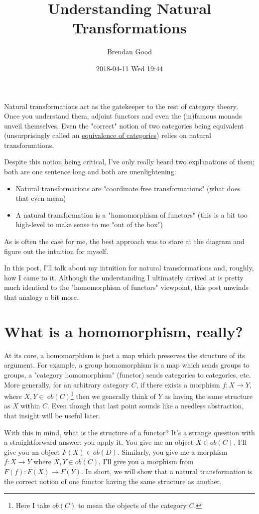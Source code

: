 \documentclass[11pt]{article}
\author{Brendan Good}
\date{2018-04-11 Wed 19:44}
\title{Understanding Natural Transformations}
\begin{document}
\maketitle
Natural transformations act as the gatekeeper to the rest of category theory. Once you understand them, adjoint functors and even the (in)famous monads unveil themselves. Even
the "correct" notion of two categories being equivalent (unsurprisingly called an \href{https://en.wikipedia.org/wiki/Equivalence\_of\_categories}{equivalence of categories}) relies on natural transformations.

Despite this notion being critical, I've only really heard two explanations of them; both are one sentence long and both are unenlightening:
\begin{itemize}
\item Natural transformations are "coordinate free transformations" (what does that even mean)
\item A natural transformation is a "homomorphism of functors" (this is a bit too high-level to make sense to me "out of the box")
\end{itemize}
As is often the case for me, the best approach was to stare at the diagram and figure out the intuition for myself.

In this post, I'll talk about my intuition for natural transformations and, roughly, how I came to it. Although the understanding I ultimately arrived at is pretty much identical
to the "homomorphism of functors" viewpoint, this post unwinds that analogy a bit more.

\section*{What is a homomorphism, really?}
\label{sec:org4427e10}
At its core, a homomorphism is just a map which preserves the structure of its argument. For example, a group homomorphism is a map which sends groups to groups,
a "category homomorphism" (functor) sends categories to categories, etc. More generally, for an arbitrary category \(C\), if there exists a morphism \(f: X\to Y\), where \(X,Y\in\ ob(C)\)\footnote{Here I take \(ob(C)\) to mean the objects of the category \(C\).}
then we generally think of \(Y\) as having the same structure as \(X\) within \(C\). Even though that last point sounds like a needless abstraction, that insight will be useful later.

With this in mind, what is the structure of a functor? It's a strange question with a straightforward answer: you apply it. You give me an object \(X\in ob(C)\),
I'll give you an object \(F(X)\in ob(D)\). Similarly, you give me a morphism \(f: X\to Y\) where \(X,Y\in ob(C)\), I'll give you a morphism from \(F(f): F(X)\to F(Y)\). In short, we will show that a natural
transformation is the correct notion of one functor having the same structure as another.
\end{document}
